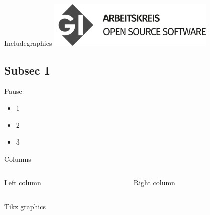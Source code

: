 \documentclass[compress,aspectratio=169]{beamer}
\begin{document}
\begin{frame}{Includegraphics}
    \centering
    \includegraphics[width=0.6\textwidth]{assets/GI_Logo_AK-OSS.png}\\
\end{frame}

\subsection{Subsec 1} %
\begin{frame}{Pause}
    \begin{itemize}
        \item 1
        \pause  %
        \item 2
        \pause
        \item 3
    \end{itemize}
\end{frame}

\begin{frame}{Columns}
    \begin{columns}
    \begin{column}{0.5\textwidth}
    Left column
    \end{column}
    \begin{column}{0.5\textwidth}
    Right column %
    \end{column}
    \end{columns}
\end{frame}

\begin{frame}{Tikz graphics}
\end{frame}
\end{document}
